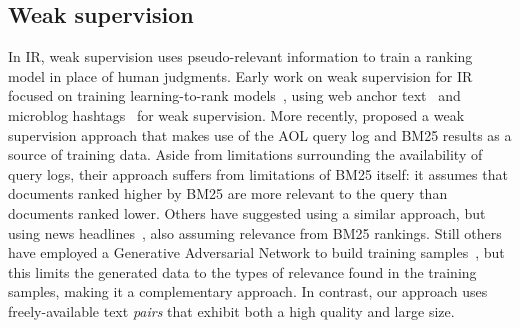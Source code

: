 \subsection{Weak supervision}\label{sec.background.weaksupervision}
In IR, weak supervision uses pseudo-relevant information to train a ranking model in place of human judgments. Early work on weak supervision for IR focused on training learning-to-rank models~\cite{azzopardi2007building},
using web anchor text~\cite{asadi2011pseudo} and microblog hashtags~\cite{berendsen2013pseudo} for weak supervision. More recently, \citet{dehghani2017neural} proposed a weak supervision approach that makes use of the AOL query log and BM25 results as a source of training data. Aside from limitations surrounding the availability of query logs, their approach suffers from limitations of BM25 itself: it assumes that documents ranked higher by BM25 are more relevant to the query than documents ranked lower. Others have suggested using a similar approach, but using news headlines~\cite{Li2018JointLF}, also assuming relevance from BM25 rankings. Still others have employed a Generative Adversarial Network to build training samples~\cite{Wang2017IRGANAM}, but this limits the generated data to the types of relevance found in the training samples, making it a complementary approach. In contrast, our approach uses freely-available text \textit{pairs} that exhibit both a high quality and large size.
